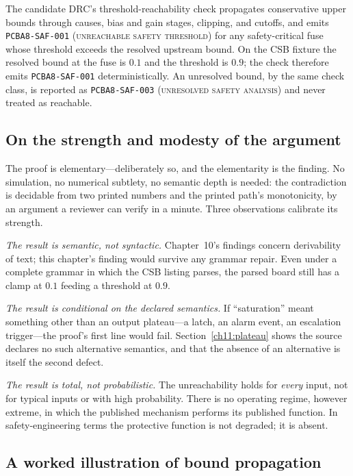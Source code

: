 \begin{corollary}\label{ch11:cor-drc}
The candidate DRC's threshold-reachability check propagates conservative upper bounds through causes, bias and gain stages, clipping, and cutoffs, and emits \texttt{PCBA8-SAF-001} (\textsc{unreachable safety threshold}) for any safety-critical fuse whose threshold exceeds the resolved upstream bound. On the CSB fixture the resolved bound at the fuse is $0.1$ and the threshold is $0.9$; the check therefore emits \texttt{PCBA8-SAF-001} deterministically. An unresolved bound, by the same check class, is reported as \texttt{PCBA8-SAF-003} (\textsc{unresolved safety analysis}) and never treated as reachable.
\end{corollary}

\subsection{On the strength and modesty of the argument}

The proof is elementary---deliberately so, and the elementarity is the finding. No simulation, no numerical subtlety, no semantic depth is needed: the contradiction is decidable from two printed numbers and the printed path's monotonicity, by an argument a reviewer can verify in a minute. Three observations calibrate its strength.

\emph{The result is semantic, not syntactic.} Chapter~10's findings concern derivability of text; this chapter's finding would survive any grammar repair. Even under a complete grammar in which the CSB listing parses, the parsed board still has a clamp at $0.1$ feeding a threshold at $0.9$.

\emph{The result is conditional on the declared semantics.} If ``saturation'' meant something other than an output plateau---a latch, an alarm event, an escalation trigger---the proof's first line would fail. Section~\ref{ch11:plateau} shows the source declares no such alternative semantics, and that the absence of an alternative is itself the second defect.

\emph{The result is total, not probabilistic.} The unreachability holds for \emph{every} input, not for typical inputs or with high probability. There is no operating regime, however extreme, in which the published mechanism performs its published function. In safety-engineering terms the protective function is not degraded; it is absent.

\subsection{A worked illustration of bound propagation}\label{ch11:worked}


